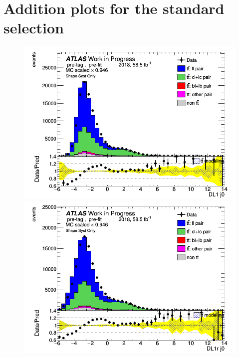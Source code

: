 \documentclass[letterpaper,12pt]{article}
\begin{document}
\section{Addition plots for the standard selection}
\begin{figure}[h]
\begin{minipage}[b]{.45\textwidth}
\centering
\includegraphics[width=1\textwidth]{Distribution_March/DataMC_J0_DL1.png}
\end{minipage}\hfill
\begin{minipage}[b]{.45\textwidth}
\centering
\includegraphics[width=1\textwidth]{Distribution_March/DataMC_J0_DL1r.png}
\end{minipage}\hfill
\begin{minipage}[b]{.45\textwidth}
\centering

\end{minipage}
\end{figure}
\end{document}

